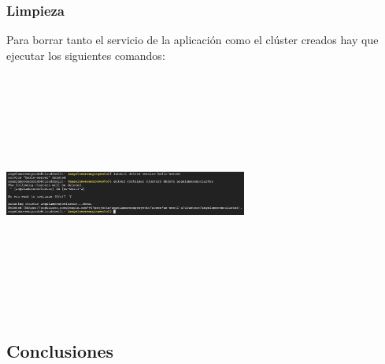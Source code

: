 \documentclass[english,runningheads,a4paper]{llncs}[2018/03/10]
\newenvironment{nscenter}
 {\parskip=0pt\par\nopagebreak\centering}
 {\par\noindent\ignorespacesafterend}
\begin{document}
\subsubsection*{Limpieza}
Para borrar tanto el servicio de la aplicación como el clúster creados hay que ejecutar los siguientes comandos:
\newline
\begin{nscenter}
\includegraphics[width=8cm,height=8cm,keepaspectratio]{./Contenedores/Googlecloud/49.png}
\end{nscenter}
\newpage
\subsection*{Conclusiones}
\end{document}
